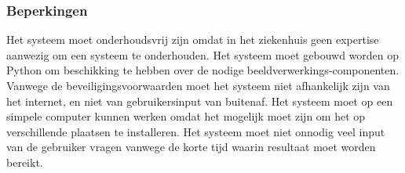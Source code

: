 \subsubsection{Beperkingen}
Het systeem moet onderhoudsvrij zijn omdat in het ziekenhuis geen expertise aanwezig om een systeem te onderhouden.
Het systeem moet gebouwd worden op Python om beschikking te hebben over de nodige beeldverwerkings-componenten.
Vanwege de beveiligingsvoorwaarden moet het systeem niet afhankelijk zijn van het internet, en niet van gebruikersinput van buitenaf.
Het systeem moet op een simpele computer kunnen werken omdat het mogelijk moet zijn om het op verschillende plaatsen te installeren.
Het systeem moet niet onnodig veel input van de gebruiker vragen vanwege de korte tijd waarin resultaat moet worden bereikt.